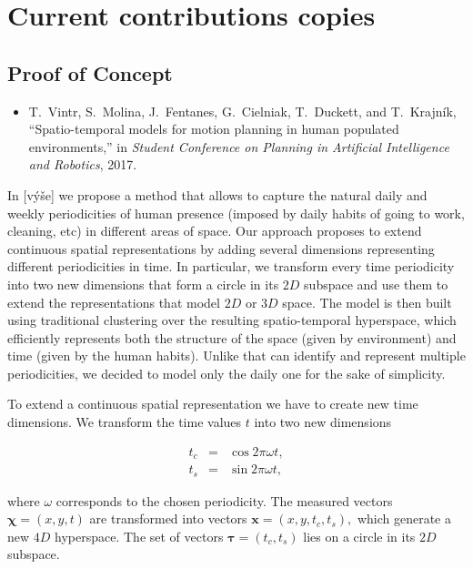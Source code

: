 \section{Current contributions copies}

\subsection{Proof of Concept}


\begin{itemize}
    \item T.~Vintr, S.~Molina, J.~Fentanes, G.~Cielniak, T.~Duckett, and T.~Krajn{\'i}k, ``Spatio-temporal models for motion planning in human populated environments,'' in \emph{Student Conference on Planning in Artificial Intelligence and Robotics}, 2017.
\end{itemize}

In [výše] we propose a method that allows to capture the natural daily and weekly periodicities of human presence (imposed by daily habits of going to work, cleaning, etc) in different areas of space.
Our approach proposes to extend continuous spatial representations by adding several dimensions representing different periodicities in time. 
In particular, we transform every time periodicity into two new dimensions that form a circle in its $2D$ subspace and use them to extend the representations that model $2D$ or $3D$ space. 
The model is then built using traditional clustering over the resulting spatio-temporal hyperspace, which efficiently represents both the structure of the space (given by environment) and time (given by the human habits).
Unlike \cite{krajnik2017fremen} that can identify and represent multiple periodicities, we decided to model only the daily one for the sake of simplicity.

To extend a continuous spatial representation we have to create new time dimensions.
We transform the time values $t$ into two new dimensions

\begin{equation}\label{trans_cos}
\begin{array}{ccc}
    t_c& = &\cos{2\pi \omega t},\\
    t_s& = &\sin{2\pi \omega t},
\end{array}
\end{equation}

\noindent where $\omega$ corresponds to the chosen periodicity.
The measured vectors $\mathbf{\chi} = (x, y, t)$ are transformed into vectors $\mathbf{x} = (x, y, t_c, t_s),$ which generate a new $4D$ hyperspace. 
The set of vectors $\mathbf{\tau} = (t_c, t_s)$ lies on a  circle  in its $2D$ subspace.


